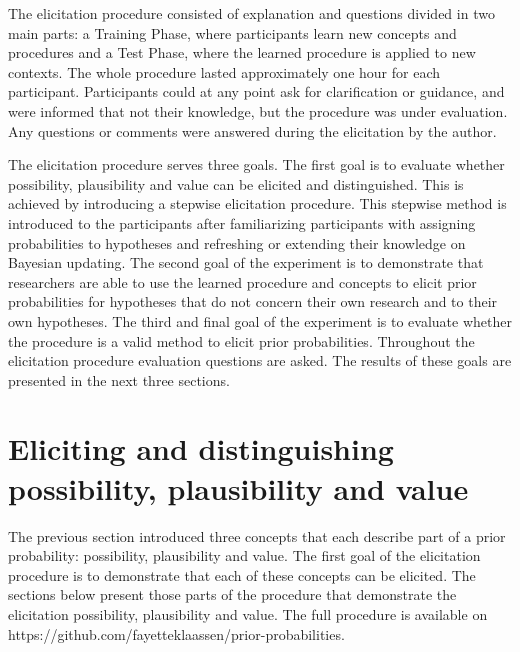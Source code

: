 \documentclass[man]{apa6}
\begin{document}
The elicitation procedure consisted of explanation and questions divided in two main parts: a Training Phase, where participants learn new concepts and procedures and a Test Phase, where the learned procedure is applied to new contexts.
The whole procedure lasted approximately one hour for each participant.
Participants could at any point ask for clarification or guidance, and were informed that not their knowledge, but the procedure was under evaluation. 
Any questions or comments were answered during the elicitation by the author.

The elicitation procedure serves three goals.
The first goal is to evaluate whether possibility, plausibility and value can be elicited and distinguished.
This is achieved by introducing a stepwise elicitation procedure.
This stepwise method is introduced to the participants after familiarizing participants with assigning probabilities to hypotheses and refreshing or extending their knowledge on Bayesian updating.
The second goal of the experiment is to demonstrate that researchers are able to use the learned procedure and concepts to elicit prior probabilities for hypotheses that do not concern their own research and to their own hypotheses.
The third and final goal of the experiment is to evaluate whether the procedure is a valid method to elicit prior probabilities. 
Throughout the elicitation procedure evaluation questions are asked.
The results of these goals are presented in the next three sections.

\section{Eliciting and distinguishing possibility, plausibility and value}
The previous section introduced three concepts that each describe part of a prior probability: possibility, plausibility and value.
The first goal of the elicitation procedure is to demonstrate that each of these concepts can be elicited.
The sections below present those parts of the procedure that demonstrate the elicitation possibility, plausibility and value.
The full procedure is available on https://github.com/fayetteklaassen/prior-probabilities.
\end{document}
